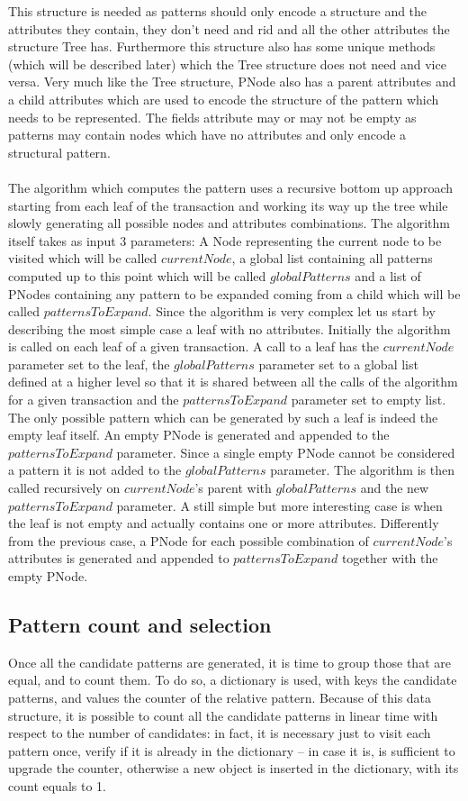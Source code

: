 \documentclass{acm_proc_article-sp-sigmod09}
\begin{document}
This structure is needed as patterns should only encode a structure and the attributes they contain, they don't need and rid and all the other attributes the structure Tree has. Furthermore this structure also has some unique methods (which will be described later) which the Tree structure does not need and vice versa. Very much like the Tree structure, PNode also has a parent attributes and a child attributes which are used to encode the structure of the pattern which needs to be represented. The fields attribute may or may not be empty as patterns may contain nodes which have no attributes and only encode a structural pattern.
\\
\\
The algorithm which computes the pattern uses a recursive bottom up approach starting from each leaf of the transaction and working its way up the tree while slowly generating all possible nodes and attributes combinations. The algorithm itself takes as input 3 parameters: A Node representing the current node to be visited which will be called $currentNode$, a global list containing all patterns computed up to this point which will be called $globalPatterns$ and a list of PNodes containing any pattern to be expanded coming from a child which will be called $patternsToExpand$. Since the algorithm is very complex let us start by describing the most simple case a leaf with no attributes. Initially the algorithm is called on each leaf of a given transaction. A call to a leaf has the $currentNode$ parameter set to the leaf, the $globalPatterns$ parameter set to a global list defined at a higher level so that it is shared between all the calls of the algorithm for a given transaction and the $patternsToExpand$ parameter set to empty list. The only possible pattern which can be generated by such a leaf is indeed the empty leaf itself. An empty PNode is generated and appended to the $patternsToExpand$ parameter. Since a single empty PNode cannot be considered a pattern it is not added to the $globalPatterns$ parameter. The algorithm is then called recursively on $currentNode$'s parent with $globalPatterns$ and the new $patternsToExpand$ parameter. A still simple but more interesting case is when the leaf is not empty and actually contains one or more attributes. Differently from the previous case, a PNode for each possible combination of $currentNode$'s attributes is generated and appended to $patternsToExpand$ together with the empty PNode.

\subsection{Pattern count and selection}
Once all the candidate patterns are generated, it is time to group those that are equal, and to count them. To do so, a dictionary is used, with keys the candidate patterns, and values the counter of the relative pattern. Because of this data structure, it is possible to count all the candidate patterns in linear time with respect to the number of candidates: in fact, it is necessary just to visit each pattern once, verify if it is already in the dictionary -- in case it is, is sufficient to upgrade the counter, otherwise a new object is inserted in the dictionary, with its count equals to 1.
\end{document}
